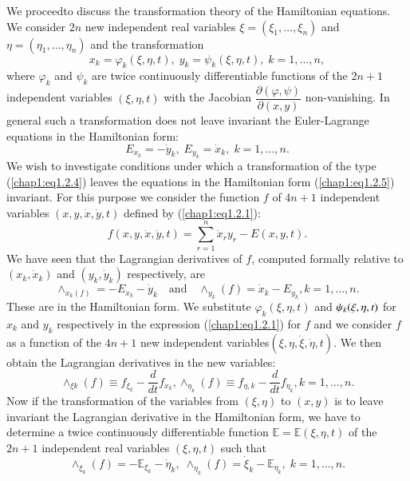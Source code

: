 We proceed\pageoriginale to discuss the transformation theory of the Hamiltonian equations. We consider $2n$ new independent real variables $\xi = (\xi_1, \ldots, \xi_n)$ and $\eta = (\eta_1, \ldots, \eta_n)$ and the transformation
\begin{equation*}
x_k = \varphi_k (\xi, \eta, t), \; y_k = \psi_k(\xi, \eta, t), \; k = 1, \ldots, n, \tag{1.2.4}\label{chap1:eq1.2.4}
\end{equation*}
where $\varphi_k$ and $\psi_k$ are twice continuously differentiable functions of the $2n+1$ independent variables $(\xi, \eta, t)$ with the Jacobian $\dfrac{\partial (\varphi, \psi)}{\partial (x,y)}$ non-vanishing. In general such a transformation does not leave invariant the Euler-Lagrange equations in the Hamiltonian form:
\begin{equation*}
E_{x_k} = - \dot{y}_k, \; E_{y_k} = \dot{x}_k, \; k = 1, \ldots, n. 
\tag{1.2.5}\label{chap1:eq1.2.5}
\end{equation*}
We wish to investigate conditions under which a transformation of the type (\ref{chap1:eq1.2.4}) leaves the equations in the Hamiltonian form (\ref{chap1:eq1.2.5}) invariant. For this purpose we consider the function $f$ of $4n+1$ independent variables $(x,y,\dot{x}, \dot{y}, t)$ defined by (\ref{chap1:eq1.2.1}):
$$
f(x,y, \dot{x}, \dot{y}, t) = \sum\limits^n_{r=1} \dot{x}_r y_r - E(x,y,t). 
$$
We have seen that the Lagrangian derivatives of $f$, computed formally relative to $(x_k, \dot{x}_k)$ and $(y_k, \dot{y}_k)$ respectively, are 
$$
\wedge_{x_k(f)} = - E_{x_k} - \dot{y}_k \quad \text{and}\quad \wedge_{y_k} (f) = \dot{x}_k - E_{y_k}, k =1 , \ldots, n.
$$
These are in the Hamiltonian form. We substitute $\varphi_k(\xi, \eta,
t)$ and $\psi_k (\xi,\break \eta, t)$ for $x_k$ and $y_k$ respectively in
the expression (\ref{chap1:eq1.2.1}) for $f$ and we consider $f$ as a
function of the $4n+1$ new independent variables\pageoriginale $(\xi,
\eta,\dot{\xi}, \dot{\eta}, t)$. We then obtain the Lagrangian
derivatives in the new variables:      
$$
\wedge_{\xi k} (f) \equiv  f_{\xi_k} - \frac{d}{dt} f_{\dot{x}_k}, \wedge_{\eta_k} (f) \equiv f_{\eta, k} -\frac{d}{dt} f_{\dot{\eta}_k} , k = 1, \ldots, n.
$$
Now if the transformation of the variables from $(\xi, \eta)$ to $(x,y)$ is to leave invariant the Lagrangian derivative in the Hamiltonian form, we have to determine a twice continuously differentiable function $\mathbb{E} = \mathbb{E} (\xi, \eta, t)$ of the $2n+1$ independent real variables $(\xi, \eta, t)$ such that 
\begin{equation*}
\wedge_{\xi_k} (f) = - \mathbb{E}_{\xi_k} - \dot{\eta}_k, \; \wedge_{\eta_k} (f) = \dot{\xi}_k - \mathbb{E}_{\eta_k}, \; k = 1, \ldots, n. \tag{1.2.6}\label{chap1:eq1.2.6}
\end{equation*}
